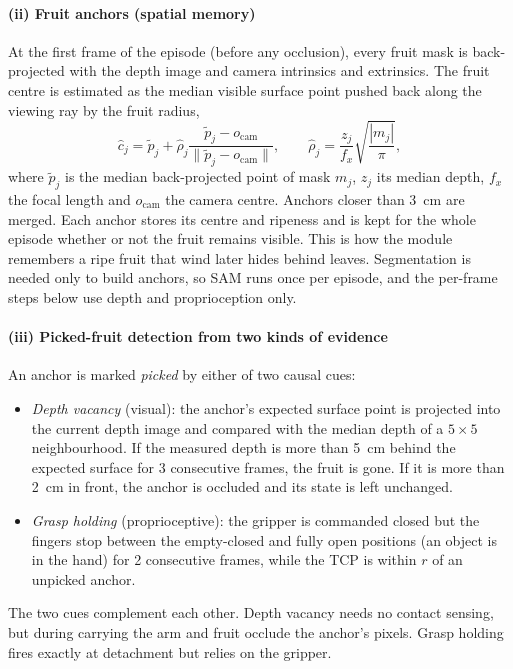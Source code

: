 \paragraph{(ii) Fruit anchors (spatial memory)} At the first frame of the episode (before any occlusion), every fruit mask is back-projected with the depth image and camera intrinsics and extrinsics. The fruit centre is estimated as the median visible surface point pushed back along the viewing ray by the fruit radius,
\begin{equation}
\hat c_j = \tilde p_j + \hat\rho_j \frac{\tilde p_j - o_{\mathrm{cam}}}{\lVert \tilde p_j - o_{\mathrm{cam}} \rVert},\qquad \hat\rho_j = \frac{z_j}{f_x}\sqrt{\frac{|m_j|}{\pi}},
\end{equation}
where $\tilde p_j$ is the median back-projected point of mask $m_j$, $z_j$ its median depth, $f_x$ the focal length and $o_{\mathrm{cam}}$ the camera centre. Anchors closer than 3~cm are merged. Each anchor stores its centre and ripeness and is kept for the whole episode whether or not the fruit remains visible. This is how the module remembers a ripe fruit that wind later hides behind leaves. Segmentation is needed only to build anchors, so SAM runs once per episode, and the per-frame steps below use depth and proprioception only.

\paragraph{(iii) Picked-fruit detection from two kinds of evidence} An anchor is marked \emph{picked} by either of two causal cues:
\begin{itemize}
\item \emph{Depth vacancy} (visual): the anchor's expected surface point is projected into the current depth image and compared with the median depth of a $5\times5$ neighbourhood. If the measured depth is more than 5~cm behind the expected surface for 3 consecutive frames, the fruit is gone. If it is more than 2~cm in front, the anchor is occluded and its state is left unchanged.
\item \emph{Grasp holding} (proprioceptive): the gripper is commanded closed but the fingers stop between the empty-closed and fully open positions (an object is in the hand) for 2 consecutive frames, while the TCP is within $r$ of an unpicked anchor.
\end{itemize}
The two cues complement each other. Depth vacancy needs no contact sensing, but during carrying the arm and fruit occlude the anchor's pixels. Grasp holding fires exactly at detachment but relies on the gripper.

